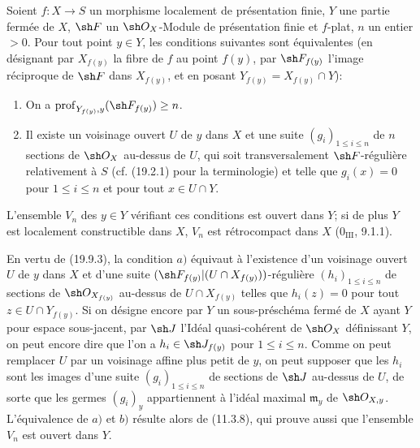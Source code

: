 \begin{proposition}[19.9.6]
\label{IV.19.9.6}
Soient $f:X\to S$ un morphisme localement de présentation finie, $Y$ une partie fermée de $X$, $\sh F$ un $\sh O_X$-Module de présentation finie et $f$-plat, $n$ un entier $>0$. Pour tout point $y\in Y$, les conditions suivantes sont équivalentes (en désignant par $X_{f(y)}$ la fibre de $f$ au point $f(y)$, par $\sh F_{f(y)}$ l'image réciproque de $\sh F$ dans $X_{f(y)}$, et en posant $Y_{f(y)}=X_{f(y)}\cap Y$):
\begin{enumerate}
  \item[a)] On a $\operatorname{prof}_{Y_{f(y)},y}(\sh F_{f(y)})\geq n$.
  \item[b)] Il existe un voisinage ouvert $U$ de $y$ dans $X$ et une suite $(g_i)_{1\leq i\leq n}$ de $n$ sections de $\sh O_X$ au-dessus de $U$, qui soit transversalement $\sh F$-régulière relativement à $S$ (cf. (19.2.1) pour la terminologie) et telle que $g_i(x)=0$ pour $1\leq i\leq n$ et pour tout $x\in U\cap Y$.
\end{enumerate}
L'ensemble $V_n$ des $y\in Y$ vérifiant ces conditions est ouvert dans $Y$; si de plus $Y$ est localement constructible dans $X$, $V_n$ est rétrocompact dans $X$ ($0_{\mathrm{III}}$, 9.1.1).
\end{proposition}

En vertu de (19.9.3), la condition $a)$ équivaut à l'existence d'un voisinage ouvert $U$ de $y$ dans $X$ et d'une suite $(\sh F_{f(y)}|(U\cap X_{f(y)}))$-régulière $(h_i)_{1\leq i\leq n}$ de sections de $\sh O_{X_{f(y)}}$ au-dessus de $U\cap X_{f(y)}$ telles que $h_i(z)=0$ pour tout $z\in U\cap Y_{f(y)}$. Si on désigne encore par $Y$ un sous-préschéma fermé de $X$ ayant $Y$ pour espace sous-jacent, par $\sh J$ l'Idéal quasi-cohérent de $\sh O_X$ définissant $Y$, on peut encore dire que l'on a $h_i\in\sh J_{f(y)}$ pour $1\leq i\leq n$. Comme on peut remplacer $U$ par un voisinage affine plus petit de $y$, on peut supposer que les $h_i$ sont les images d'une suite $(g_i)_{1\leq i\leq n}$ de sections de $\sh J$ au-dessus de $U$, de sorte que les germes $(g_i)_y$ appartiennent à l'idéal maximal $\mathfrak m_y$ de $\sh O_{X,y}$. L'équivalence de $a)$ et $b)$ résulte alors de (11.3.8), qui prouve aussi que l'ensemble $V_n$ est ouvert dans $Y$.


